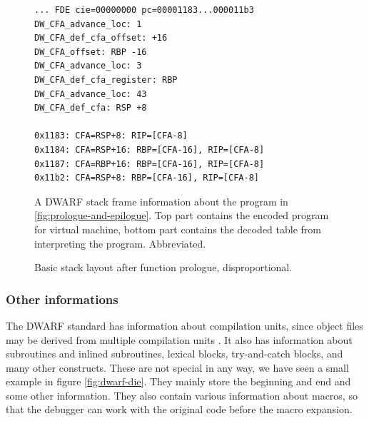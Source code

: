 \begin{figure}
    \begin{lstlisting}
... FDE cie=00000000 pc=00001183...000011b3
DW_CFA_advance_loc: 1
DW_CFA_def_cfa_offset: +16
DW_CFA_offset: RBP -16
DW_CFA_advance_loc: 3
DW_CFA_def_cfa_register: RBP
DW_CFA_advance_loc: 43
DW_CFA_def_cfa: RSP +8

0x1183: CFA=RSP+8: RIP=[CFA-8]
0x1184: CFA=RSP+16: RBP=[CFA-16], RIP=[CFA-8]
0x1187: CFA=RBP+16: RBP=[CFA-16], RIP=[CFA-8]
0x11b2: CFA=RSP+8: RBP=[CFA-16], RIP=[CFA-8]
    \end{lstlisting}
    \caption{A DWARF stack frame information about the program in
             \ref{fig:prologue-and-epilogue}. Top part contains the encoded
             program for virtual machine, bottom part contains the decoded
             table from interpreting the program. Abbreviated.}
    \label{fig:dwarf-stack-frames}
\end{figure}

\begin{figure}
    \caption{Basic stack layout after function prologue, disproportional.}
    \label{fig:stack-layout}
\end{figure}

\subsubsection{Other informations}
The DWARF standard has information about compilation units, since object files
may be derived from multiple compilation units \cite{dwarf}. It also has
information about subroutines and inlined subroutines, lexical blocks,
try-and-catch blocks, and many other constructs. These are not special in any
way, we have seen a small example in figure \ref{fig:dwarf-die}. They mainly
store the beginning and end and some other information. They also contain
various information about macros, so that the debugger can work with the
original code before the macro expansion.

